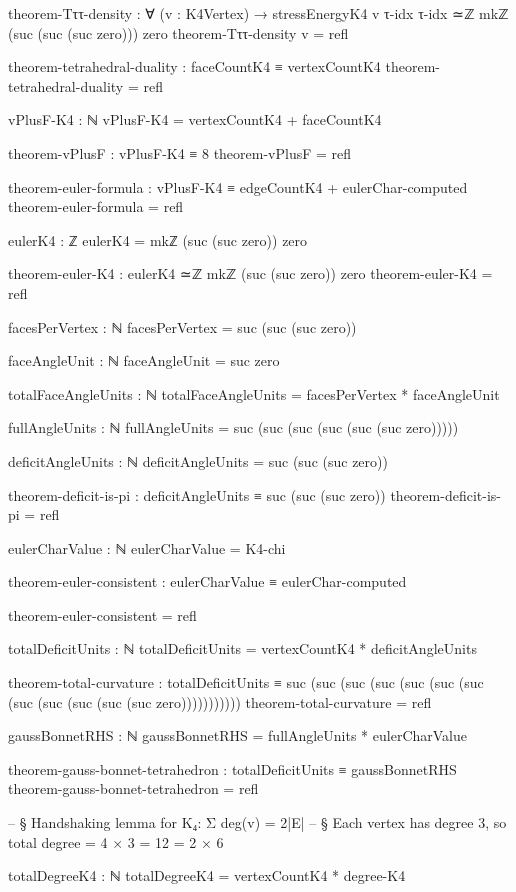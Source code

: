 \documentclass[11pt,a4paper]{book}
\begin{document}
\begin{code}
theorem-Tττ-density : ∀ (v : K4Vertex) → 
  stressEnergyK4 v τ-idx τ-idx ≃ℤ mkℤ (suc (suc (suc zero))) zero
theorem-Tττ-density v = refl



theorem-tetrahedral-duality : faceCountK4 ≡ vertexCountK4
theorem-tetrahedral-duality = refl

vPlusF-K4 : ℕ
vPlusF-K4 = vertexCountK4 + faceCountK4

theorem-vPlusF : vPlusF-K4 ≡ 8
theorem-vPlusF = refl


theorem-euler-formula : vPlusF-K4 ≡ edgeCountK4 + eulerChar-computed
theorem-euler-formula = refl

eulerK4 : ℤ
eulerK4 = mkℤ (suc (suc zero)) zero

theorem-euler-K4 : eulerK4 ≃ℤ mkℤ (suc (suc zero)) zero
theorem-euler-K4 = refl

facesPerVertex : ℕ
facesPerVertex = suc (suc (suc zero))

faceAngleUnit : ℕ
faceAngleUnit = suc zero

totalFaceAngleUnits : ℕ
totalFaceAngleUnits = facesPerVertex * faceAngleUnit

fullAngleUnits : ℕ
fullAngleUnits = suc (suc (suc (suc (suc (suc zero)))))

deficitAngleUnits : ℕ
deficitAngleUnits = suc (suc (suc zero))

theorem-deficit-is-pi : deficitAngleUnits ≡ suc (suc (suc zero))
theorem-deficit-is-pi = refl

eulerCharValue : ℕ
eulerCharValue = K4-chi

theorem-euler-consistent : eulerCharValue ≡ eulerChar-computed

theorem-euler-consistent = refl

totalDeficitUnits : ℕ
totalDeficitUnits = vertexCountK4 * deficitAngleUnits

theorem-total-curvature : totalDeficitUnits ≡ suc (suc (suc (suc (suc (suc (suc (suc (suc (suc (suc (suc zero)))))))))))
theorem-total-curvature = refl

gaussBonnetRHS : ℕ
gaussBonnetRHS = fullAngleUnits * eulerCharValue

theorem-gauss-bonnet-tetrahedron : totalDeficitUnits ≡ gaussBonnetRHS
theorem-gauss-bonnet-tetrahedron = refl

-- § Handshaking lemma for K₄: Σ deg(v) = 2|E|
-- § Each vertex has degree 3, so total degree = 4 × 3 = 12 = 2 × 6

totalDegreeK4 : ℕ
totalDegreeK4 = vertexCountK4 * degree-K4


\end{code}
\end{document}
